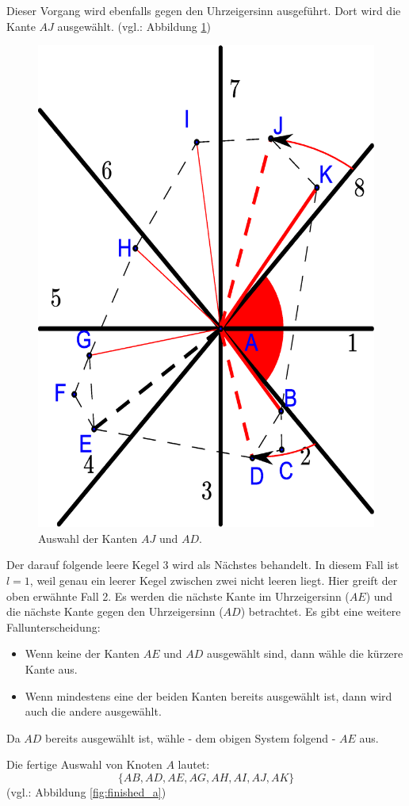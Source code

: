\documentclass[a4paper,twoside]{IEEEtran}
\begin{document}
Dieser Vorgang wird ebenfalls gegen den Uhrzeigersinn ausgeführt.
Dort wird die Kante $AJ $ ausgewählt. (vgl.: Abbildung \ref{fig:twoempty})

\begin{figure}[h!]
\centering
\includegraphics[width=0.6\linewidth]{twoempty_cone.eps}
\caption{Auswahl der Kanten $AJ $ und $AD $.}
\label{fig:twoempty}
\end{figure}

Der darauf folgende leere Kegel $3 $ wird als Nächstes behandelt.
In diesem Fall ist $l=1 $, weil genau ein leerer Kegel zwischen zwei nicht leeren liegt.
Hier greift der oben erwähnte Fall 2.
Es werden die nächste Kante im Uhrzeigersinn ($AE $) und die nächste Kante gegen den Uhrzeigersinn ($AD $) betrachtet.
Es gibt eine weitere Fallunterscheidung:
\begin{itemize}
\item Wenn keine der Kanten $AE $ und $AD $ ausgewählt sind, dann wähle die kürzere Kante aus.
\item Wenn mindestens eine der beiden Kanten bereits ausgewählt ist, dann wird auch die andere ausgewählt.
\end{itemize}
Da $AD $ bereits ausgewählt ist, wähle - dem obigen System folgend - $AE $ aus.

Die fertige Auswahl von Knoten $A $ lautet:
\begin{equation*}
\{AB, AD, AE, AG, AH, AI, AJ, AK\}
\end{equation*}
(vgl.: Abbildung \ref{fig:finished_a})
\end{document}
